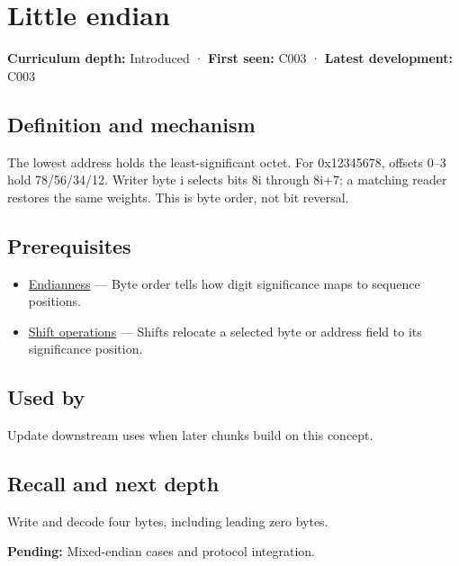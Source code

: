 \hypertarget{appendix-367b6abf460e}{}\label{referencestart:appendix-367b6abf460e}
\section{Little endian}\label{appendix-367b6abf460e-little-endian}

\textbf{Curriculum depth:} Introduced · \textbf{First seen:} C003 · \textbf{Latest development:} C003

\subsection{Definition and mechanism}\label{appendix-367b6abf460e-definition-and-mechanism}

The lowest address holds the least-significant octet. For 0x12345678, offsets 0--3 hold 78/56/34/12. Writer byte i selects bits 8i through 8i+7; a matching reader restores the same weights. This is byte order, not bit reversal.

\subsection{Prerequisites}\label{appendix-367b6abf460e-prerequisites}

\begin{itemize}
\tightlist
\item
  \hyperref[appendix-bc07c3d25b18]{Endianness} --- Byte order tells how digit significance maps to sequence positions.
\item
  \hyperref[appendix-73425b25118e]{Shift operations} --- Shifts relocate a selected byte or address field to its significance position.
\end{itemize}

\subsection{Used by}\label{appendix-367b6abf460e-used-by}

Update downstream uses when later chunks build on this concept.

\subsection{Recall and next depth}\label{appendix-367b6abf460e-recall-and-next-depth}

Write and decode four bytes, including leading zero bytes.

\textbf{Pending:} Mixed-endian cases and protocol integration.

